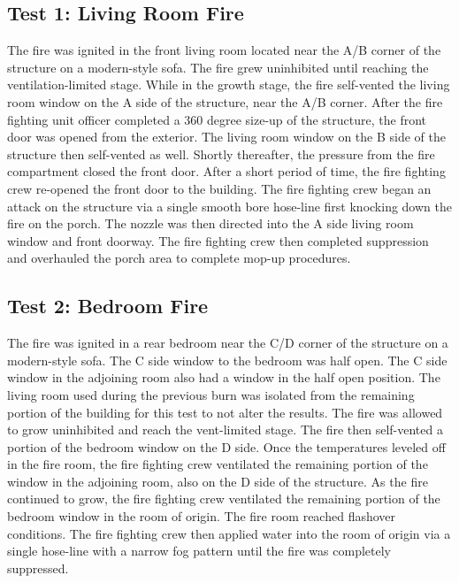 \documentclass[12pt,oneside]{book}
\begin{document}
\subsection{Test 1: Living Room Fire}

The fire was ignited in the front living room located near the A/B corner of the structure on a modern-style sofa. The fire grew uninhibited until reaching the ventilation-limited stage. While in the growth stage, the fire self-vented the living room window on the A side of the structure, near the A/B corner. After the fire fighting unit officer completed a 360 degree size-up of the structure, the front door was opened from the exterior. The living room window on the B side of the structure then self-vented as well. Shortly thereafter, the pressure from the fire compartment closed the front door. After a short period of time, the fire fighting crew re-opened the front door to the building. The fire fighting crew began an attack on the structure via a single smooth bore hose-line first knocking down the fire on the porch. The nozzle was then directed into the A side living room window and front doorway. The fire fighting crew then completed suppression and overhauled the porch area to complete mop-up procedures.

\subsection{Test 2: Bedroom Fire}

The fire was ignited in a rear bedroom near the C/D corner of the structure on a modern-style sofa. The C side window to the bedroom was half open. The C side window in the adjoining room also had a window in the half open position. The living room used during the previous burn was isolated from the remaining portion of the building for this test to not alter the results. The fire was allowed to grow uninhibited and reach the vent-limited stage. The fire then self-vented a portion of the bedroom window on the D side. Once the temperatures leveled off in the fire room, the fire fighting crew ventilated the remaining portion of the window in the adjoining room, also on the D side of the structure. As the fire continued to grow, the fire fighting crew ventilated the remaining portion of the bedroom window in the room of origin. The fire room reached flashover conditions. The fire fighting crew then applied water into the room of origin via a single hose-line with a narrow fog pattern until the fire was completely suppressed.
\end{document}
